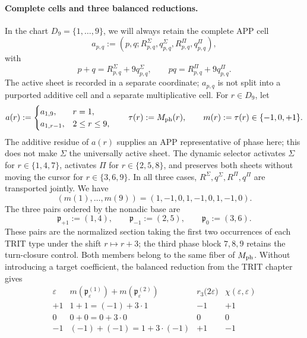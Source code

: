 \paragraph{Complete cells and three balanced reductions.}
In the chart \(D_9=\{1,\ldots,9\}\), we will always retain the complete APP
cell
\[
 a_{p,q}:=(p,q;R^\Sigma_{p,q},q^\Sigma_{p,q},
                 R^\Pi_{p,q},q^\Pi_{p,q}),
\]
with
\[
 p+q=R^\Sigma_{p,q}+9q^\Sigma_{p,q},\qquad
 pq=R^\Pi_{p,q}+9q^\Pi_{p,q}.
\]
The active sheet is recorded in a separate coordinate; \(a_{p,q}\) is not
split into a purported additive cell and a separate multiplicative cell. For
\(r\in D_9\), let
\begin{equation}
 a(r):=
 \begin{cases}
  a_{1,9},&r=1,\\
  a_{1,r-1},&2\le r\le9,
 \end{cases}
 \qquad
 \tau(r):=M_{\rm ph}(r),
 \qquad
 m(r):=\tau(r)\in\{-1,0,+1\}.
 \label{ix:eq:celula-completa-fase-ch}
\end{equation}
The additive residue of \(a(r)\) supplies an APP representative of phase
here; this does not make \(\Sigma\) the universally active sheet. The dynamic
selector activates \(\Sigma\) for \(r\in\{1,4,7\}\), activates \(\Pi\) for
\(r\in\{2,5,8\}\), and preserves both sheets without moving the cursor for
\(r\in\{3,6,9\}\). In all three cases,
\(R^\Sigma,q^\Sigma,R^\Pi,q^\Pi\) are transported jointly. We have
\[
 (m(1),\ldots,m(9))=(1,-1,0,1,-1,0,1,-1,0).
\]
The three pairs ordered by the nonadic base are
\begin{equation}
 \mathfrak p_{+1}:=(1,4),\qquad
 \mathfrak p_{-1}:=(2,5),\qquad
 \mathfrak p_{0}:=(3,6).
 \label{ix:eq:tres-pares-internos-ch}
\end{equation}
These pairs are the normalized section taking the first two occurrences of
each TRIT type under the shift \(r\mapsto r+3\); the third phase block
\(7,8,9\) retains the turn-closure control. Both members belong to the same
fiber of \(M_{\rm ph}\). Without introducing a target coefficient, the
balanced reduction from the TRIT chapter gives
\begin{equation}
 \begin{array}{c|c|c|c}
 \varepsilon&m(\mathfrak p_\varepsilon^{(1)})
                  +m(\mathfrak p_\varepsilon^{(2)})
   &r_3\bigl(2\varepsilon\bigr)&
   \chi(\varepsilon,\varepsilon)\\ \hline
 +1&1+1=(-1)+3\cdot1&-1&+1\\
 0&0+0=0+3\cdot0&0&0\\
 -1&(-1)+(-1)=1+3\cdot(-1)&+1&-1
 \end{array}
 \label{ix:eq:tres-carry-derivados-ch}
\end{equation}

